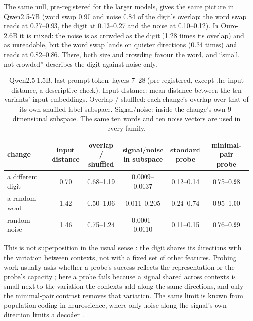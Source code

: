 \documentclass{article}
\begin{document}
The same null, pre-registered for the larger models, gives the same picture in Qwen2.5-7B (word swap 0.90 and noise 0.84 of the digit's overlap; the word swap reads at 0.27--0.93, the digit at 0.13--0.27 and the noise at 0.10--0.12). In Ouro-2.6B it is mixed: the noise is as crowded as the digit (1.28 times its overlap) and as unreadable, but the word swap lands on quieter directions (0.34 times) and reads at 0.82--0.86. There, both size and crowding favour the word, and ``small, not crowded'' describes the digit against noise only.

\begin{table}[t]
\centering
\caption{Qwen2.5-1.5B, last prompt token, layers 7--28 (pre-registered, except the input distance, a descriptive check). Input distance: mean distance between the ten variants' input embeddings. Overlap / shuffled: each change's overlap over that of its own shuffled-label subspace. Signal/noise: inside the change's own 9-dimensional subspace. The same ten words and ten noise vectors are used in every family.}
\label{tab:perturb}
\small
\begin{tabular}{@{}lccccc@{}}
\toprule
change & \shortstack{input\\distance} & \shortstack{overlap /\\shuffled} & \shortstack{signal/noise\\in subspace} & \shortstack{standard\\probe} & \shortstack{minimal-pair\\probe} \\
\midrule
a different digit & 0.70 & 0.68--1.19 & 0.0009--0.0037 & 0.12--0.14 & 0.75--0.98 \\
a random word & 1.42 & 0.50--1.06 & 0.011--0.205 & 0.24--0.74 & 0.95--1.00 \\
random noise & 1.46 & 0.75--1.24 & 0.0001--0.0010 & 0.11--0.15 & 0.76--0.99 \\
\bottomrule
\end{tabular}
\end{table}

This is not superposition in the usual sense \citep{elhage2022}: the digit shares its directions with the variation between contexts, not with a fixed set of other features. Probing work usually asks whether a probe's success reflects the representation or the probe's capacity \citep{hewitt2019}; here a probe fails because a signal shared across contexts is small next to the variation the contexts add along the same directions, and only the minimal-pair contrast removes that variation. The same limit is known from population coding in neuroscience, where only noise along the signal's own direction limits a decoder \citep{morenobote2014}.
\end{document}
